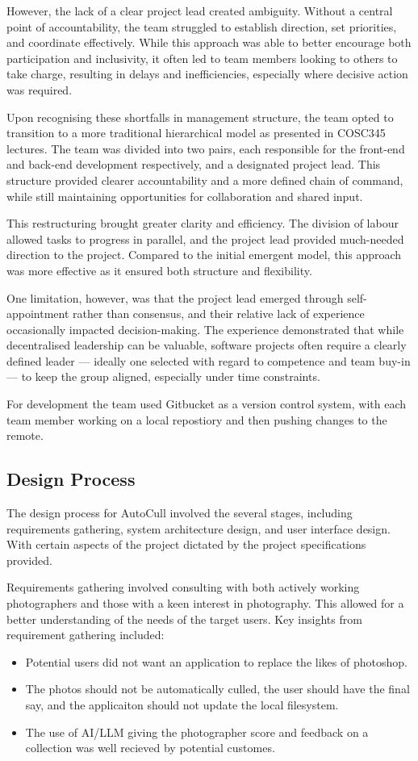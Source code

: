 \documentclass[conference]{IEEEtran}
\begin{document}
However, the lack of a clear project lead created ambiguity. Without a central point of accountability, the team struggled to establish direction, set priorities, and coordinate effectively. While this approach was able to better encourage both participation and inclusivity, it often led to team members looking to others to take charge, resulting in delays and inefficiencies, especially where decisive action was required.

Upon recognising these shortfalls in management structure, the team opted to transition to a more traditional hierarchical model as presented in COSC345 lectures. The team was divided into two pairs, each responsible for the front-end and back-end development respectively, and a designated project lead. This structure provided clearer accountability and a more defined chain of command, while still maintaining opportunities for collaboration and shared input.

This restructuring brought greater clarity and efficiency. The division of labour allowed tasks to progress in parallel, and the project lead provided much-needed direction to the project. Compared to the initial emergent model, this approach was more effective as it ensured both structure and flexibility. 

One limitation, however, was that the project lead emerged through self-appointment rather than consensus, and their relative lack of experience occasionally impacted decision-making. The experience demonstrated that while decentralised leadership can be valuable, software projects often require a clearly defined leader — ideally one selected with regard to competence and team buy-in — to keep the group aligned, especially under time constraints.

For development the team used Gitbucket as a version control system, with each team member working on a local repostiory and then pushing changes to the remote.

\subsection{Design Process}
The design process for AutoCull involved the several stages, including requirements gathering, system architecture design, and user interface design. With certain aspects of the project dictated by the project specifications provided.

Requirements gathering involved consulting with both actively working photographers and those with a keen interest in photography. This allowed for a better understanding of the needs of the target users. Key insights from requirement gathering included:
\begin{itemize}
    \item Potential users did not want an application to replace the likes of photoshop.
    \item The photos should not be automatically culled, the user should have the final say, and the applicaiton should not update the local filesystem.
    \item The use of AI/LLM giving the photographer score and feedback on a collection was well recieved by potential customes.
\end{itemize}
\end{document}
